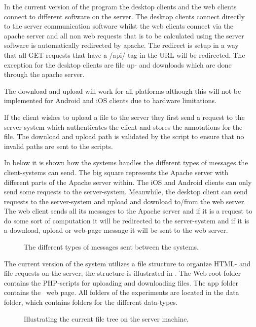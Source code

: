 In the current version of the program the desktop clients and the web clients connect to different software on the server. The desktop clients connect directly to the server communication software whilst the web clients connect via the apache server and all non web requests that is to be calculated using the server software is automatically redirected by apache.
The redirect is setup in a way that all GET requests that have a /api/ tag in the URL will be redirected.
The exception for the desktop clients are file up- and downloads which are done through the apache server.

The download and upload will work for all platforms although this will not be implemented for Android and iOS clients due to hardware limitations.

If the client wishes to upload a file to the server they first send a request to the server-system which authenticates the client and stores the annotations for the file. The download and upload path is validated by the script to ensure that no invalid paths are sent to the scripts.

In  below it is shown how the systems handles the different types of messages the client-systems can send. The big square represents the Apache server with different parts of the Apache server within. The iOS and Android clients can only send some requests to the server-system. Meanwhile, the desktop client can send requests to the server-system and upload and download to/from the web server. The web client sends all its messages to the Apache server and if it is a request to do some sort of computation it will be redirected to the server-system and if it is a download, upload or web-page message it will be sent to the web server.

\begin{figure}[hbt]
\caption{The different types of messages sent between the systems.}
\label{fig:exp_flow}
\end{figure}

The current version of the system utilizes a file structure to organize HTML- and file requests on the server, the structure is illustrated in . The Web-root folder contains the PHP-scripts for uploading and downloading files. The app folder contains the \appName\ web page. All folders of the experiments are located in the data folder, which contains folders for the different data-types.

\begin{figure}[hbt]
\caption{Illustrating the current file tree on the server machine.}
\label{fig:exp_filestructure}
\end{figure}